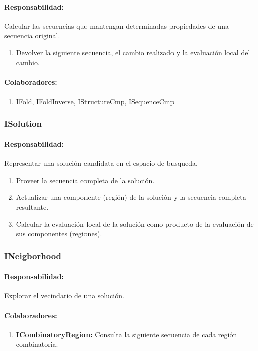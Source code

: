     \paragraph{Responsabilidad:} Calcular las secuencias que mantengan
determinadas propiedades de una secuencia original.    
      \begin{enumerate}
       \item Devolver la siguiente secuencia, el cambio realizado y la
evaluaci\'on local del cambio.       
      \end{enumerate}
    \paragraph{Colaboradores:}
      \begin{enumerate}
       \item IFold, IFoldInverse, IStructureCmp, ISequenceCmp
      \end{enumerate}

  \subsubsection{ISolution}
    \paragraph{Responsabilidad:} Representar una soluci\'on candidata en el
espacio de busqueda.
      \begin{enumerate}
       \item Proveer la secuencia completa de la soluci\'on.
       \item Actualizar una componente (regi\'on) de la soluci\'on y la
secuencia completa resultante.
       \item Calcular la evaluaci\'on local de la soluci\'on como producto de
la evaluaci\'on de sus componentes (regiones).
      \end{enumerate}         

  \subsubsection{INeigborhood}
    \paragraph{Responsabilidad:} Explorar el vecindario de una soluci\'on.      
    \paragraph{Colaboradores:}
      \begin{enumerate}
       \item \textbf{ICombinatoryRegion:} Consulta la siguiente secuencia de
cada regi\'on combinatoria.
      \end{enumerate}

